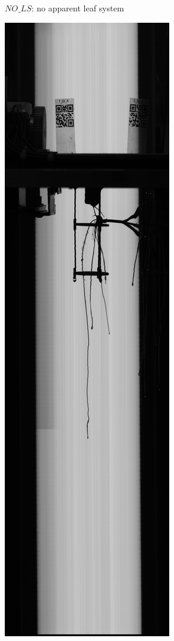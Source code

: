 \begin{figure}
\begin{subfigure}[b]{.13\textwidth}
  \caption{$NO\_LS$: no apparent leaf system}
  \label{fig:NO_LS}
\end{subfigure}
%
\begin{subfigure}[b]{.13\textwidth}
  \centering
  \includegraphics[width=\linewidth]{figures/BAD_LS.jpg}

\end{subfigure}
\end{figure}
